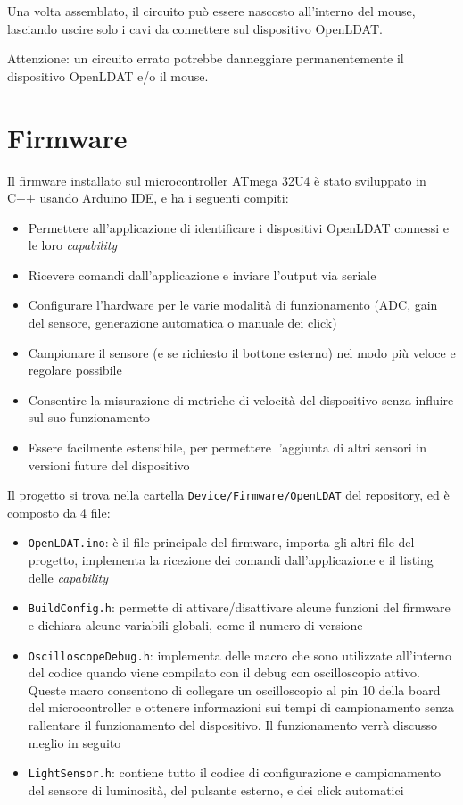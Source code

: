 Una volta assemblato, il circuito può essere nascosto all'interno del mouse, lasciando uscire solo i cavi da connettere sul dispositivo OpenLDAT.

Attenzione: un circuito errato potrebbe danneggiare permanentemente il dispositivo OpenLDAT e/o il mouse.

\section{Firmware}
Il firmware installato sul microcontroller ATmega 32U4 è stato sviluppato in C++ usando Arduino IDE, e ha i seguenti compiti:
\begin{itemize}
	\item Permettere all'applicazione di identificare i dispositivi OpenLDAT connessi e le loro \textit{capability}
	\item Ricevere comandi dall'applicazione e inviare l'output via seriale
	\item Configurare l'hardware per le varie modalità di funzionamento (ADC, gain del sensore, generazione automatica o manuale dei click)
	\item Campionare il sensore (e se richiesto il bottone esterno) nel modo più veloce e regolare possibile
	\item Consentire la misurazione di metriche di velocità del dispositivo senza influire sul suo funzionamento
	\item Essere facilmente estensibile, per permettere l'aggiunta di altri sensori in versioni future del dispositivo
\end{itemize}

Il progetto si trova nella cartella \texttt{Device/Firmware/OpenLDAT} del repository, ed è composto da 4 file:
\begin{itemize}
	\item \texttt{OpenLDAT.ino}: è il file principale del firmware, importa gli altri file del progetto, implementa la ricezione dei comandi dall'applicazione e il listing delle \textit{capability}
	\item \texttt{BuildConfig.h}: permette di attivare/disattivare alcune funzioni del firmware e dichiara alcune variabili globali, come il numero di versione
	\item \texttt{OscilloscopeDebug.h}: implementa delle macro che sono utilizzate all'interno del codice quando viene compilato con il debug con oscilloscopio attivo. Queste macro consentono di collegare un oscilloscopio al pin 10 della board del microcontroller e ottenere informazioni sui tempi di campionamento senza rallentare il funzionamento del dispositivo. Il funzionamento verrà discusso meglio in seguito
	\item \texttt{LightSensor.h}: contiene tutto il codice di configurazione e campionamento del sensore di luminosità, del pulsante esterno, e dei click automatici
\end{itemize}


